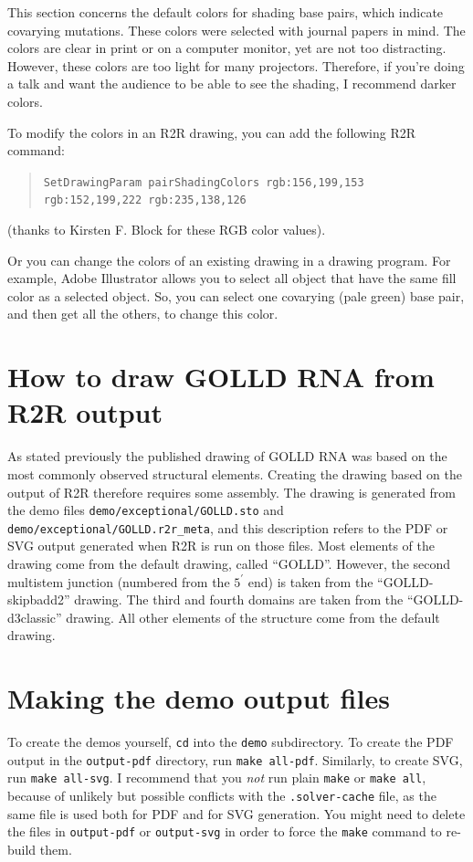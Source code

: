 \documentclass[letterpaper,12pt]{report}
\newcommand{\example}[1]{
\begin{quote}
{\raggedright
#1
}
\end{quote}
}
\newcommand{\examplett}[1]{
\example{{\tt #1}}
}
\begin{document}
This section concerns the default colors for shading base pairs, which indicate covarying mutations.
These colors were selected with journal papers in mind.  The colors are clear in print or on a computer monitor,
yet are not too distracting.
However, these colors are too light for many projectors.  Therefore, if you're doing a talk and want the audience to be able to
see the shading, I recommend darker colors.

To modify the colors in an R2R drawing, you can add the following R2R command:
\examplett{SetDrawingParam pairShadingColors rgb:156,199,153 rgb:152,199,222 rgb:235,138,126}
(thanks to Kirsten F. Block for these RGB color values).

Or you can change the colors of an existing drawing in a drawing program.  For example, Adobe Illustrator allows you to select all object that
have the same fill color as a selected object.  So, you can select one covarying (pale green) base pair, and then get all the others,
to change this color.

\section{How to draw GOLLD RNA from R2R output}
\label{sec:GOLLD}
As stated previously the published drawing of GOLLD RNA \cite{CoolRNAs}
was based on the most commonly observed structural elements.
Creating the drawing based on the output of R2R therefore requires some assembly.
The drawing is generated from the demo files
{\tt demo/exceptional/GOLLD.sto} and {\tt demo/exceptional/GOLLD.r2r\_meta},
and this description refers to the PDF or SVG output generated when R2R is run on those files.
Most elements of the drawing come from the default drawing, called ``GOLLD''.
However, the second multistem junction (numbered from the $5^\prime$ end)
is taken from the ``GOLLD-skipbadd2'' drawing.
The third and fourth domains are taken from the ``GOLLD-d3classic'' drawing.
All other elements of the structure come from the default drawing.

\section{Making the demo output files}
\label{sec:MakeDemos}

To create the demos yourself, {\tt cd} into the {\tt demo} subdirectory.
To create the PDF output in the {\tt output-pdf} directory, run {\tt make all-pdf}.
Similarly, to create SVG, run {\tt make all-svg}.  I recommend that you {\em not} run plain {\tt make} or {\tt make all}, because of unlikely but possible conflicts with the {\tt .solver-cache} file, as the same file is used both for PDF and for SVG generation.
You might need to delete the files in {\tt output-pdf} or {\tt output-svg} in order to force the {\tt make} command to re-build them.
\end{document}
